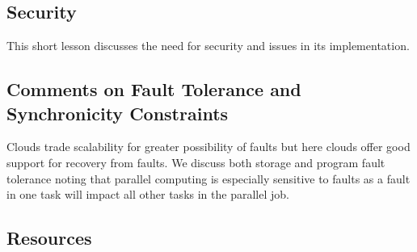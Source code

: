 
\subsection{Security}\label{security}

This short lesson discusses the need for security and issues in its
implementation.



\subsection{Comments on Fault Tolerance and Synchronicity Constraints}\label{comments-on-fault-tolerance-and-synchronicity-constraints}

Clouds trade scalability for greater possibility of faults but here
clouds offer good support for recovery from faults. We discuss both
storage and program fault tolerance noting that parallel computing is
especially sensitive to faults as a fault in one task will impact all
other tasks in the parallel job.


\subsection{Resources}

